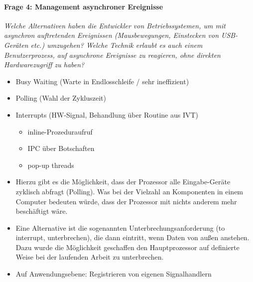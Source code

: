 \documentclass[a4paper]{article}
\begin{document}
\paragraph{Frage 4: Management asynchroner Ereignisse}
\textit{Welche Alternativen haben die Entwickler von Betriebssystemen, um mit asynchron auftretenden Ereignissen (Mausbewegungen, Einstecken von USB-Geräten etc.) umzugehen? Welche Technik erlaubt es auch einem Benutzerprozess, auf asynchrone Ereignisse zu reagieren, ohne direkten Hardwarezugriff zu haben?}
	\begin{itemize}
		\item Busy Waiting (Warte in Endlosschleife / sehr ineffizient)
		\item Polling (Wahl der Zykluszeit)
		\item Interrupts (HW-Signal, Behandlung über Routine aus IVT)
		\begin{itemize}
			\item inline-Prozeduraufruf
			\item IPC über Botschaften
			\item pop-up threads
		\end{itemize}
		\item Hierzu gibt es die Möglichkeit, dass der Prozessor alle Eingabe-Geräte zyklisch abfragt (Polling). Was bei der Vielzahl an Komponenten in einem Computer bedeuten würde, dass der Prozessor mit nichts anderem mehr beschäftigt wäre.
		\item Eine Alternative ist die sogenannten Unterbrechungsanforderung (to interrupt, unterbrechen), die dann eintritt, wenn Daten von außen anstehen. Dazu wurde die Möglichkeit geschaffen den Hauptprozessor auf definierte Weise bei der laufenden Arbeit zu unterbrechen.
		\item Auf Anwendungsebene: Registrieren von eigenen Signalhandlern
	\end{itemize}

\end{document}
